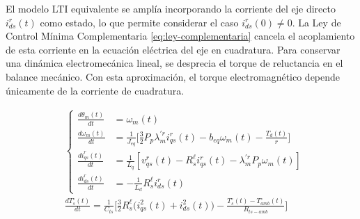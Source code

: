 \documentclass[blue,fullpaper]{ludusofficial}  %
\begin{document}
El modelo LTI equivalente se amplía incorporando la corriente
del eje directo $i_{ds}^{r}(t)$ como estado, lo que permite
considerar el caso $i_{ds}^{r}(0)\neq 0$. La Ley de Control
Mínima Complementaria \eqref{eq:ley-complementaria} cancela el
acoplamiento de esta corriente en la ecuación eléctrica del
eje en cuadratura. Para conservar una dinámica electromecánica
lineal, se desprecia el torque de reluctancia en el balance
mecánico. Con esta aproximación, el torque electromagnético
depende únicamente de la corriente de cuadratura.

\begin{equation}
\label{eq:modelo-lti-aumentado}
\begin{aligned}
& \left\{
    \begin{aligned}
        \frac{d\theta_m(t)}{dt} &= \omega_m(t) \\[1.5ex]
        \frac{d\omega_{m}(t)}{dt} &= \frac{1}{J_{eq}} \Bigg[ \frac{3}{2}P_{p} \lambda_{m}^{'r} i_{qs}^{r}(t) - b_{eq}  \omega_{m}(t) - \frac{T_d(t)}{r} \Bigg]  \\[1.5ex]
        \frac{di_{qs}^{r}(t)}{dt}  &= \frac{1}{L_{q} } \left[ v_{qs}^{r}(t) - R_{s}^{\ell} i_{qs}^{r}(t) - \lambda_{m}^{'r}P_{p} \omega_{m}(t) \right] \\[1.5ex]
        \frac{di_{ds}^{r}(t)}{dt} &= -\frac{1}{L_{d}} R_{s}^{\ell} i_{ds}^{r}(t)
    \end{aligned}
\right. \\[2ex]
& \frac{dT_{s}^{\circ}(t)}{dt} = \frac{1}{C_{ts}} \Bigg[ \frac{3}{2} R_{s}^{\ell}\Big(i_{qs}^{2}(t) +i_{ds}^{2}(t)\Big)  - \frac{T_{s}^{\circ}(t) - T_{amb}^{\circ}(t)}{R_{ts-amb}} \Bigg]
\end{aligned}
\end{equation}
\end{document}
